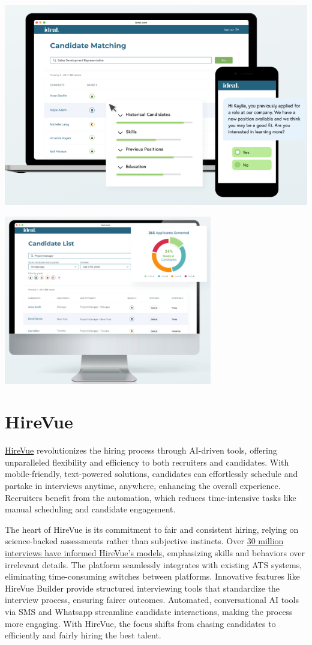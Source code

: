 \documentclass[
]{book}
\begin{document}
\includegraphics[width=5.46875in,height=\textheight]{ideal pic 1.png}

\includegraphics[width=3.57292in,height=\textheight]{ideal pic 2.png}

\hypertarget{hirevue}{%
\section{HireVue}\label{hirevue}}

\href{https://www.hirevue.com/}{HireVue} revolutionizes the hiring process through AI-driven tools, offering unparalleled flexibility and efficiency to both recruiters and candidates. With mobile-friendly, text-powered solutions, candidates can effortlessly schedule and partake in interviews anytime, anywhere, enhancing the overall experience. Recruiters benefit from the automation, which reduces time-intensive tasks like manual scheduling and candidate engagement.

The heart of HireVue is its commitment to fair and consistent hiring, relying on science-backed assessments rather than subjective instincts. Over \href{https://www.hirevue.com/our-science}{30 million interviews have informed HireVue's models}, emphasizing skills and behaviors over irrelevant details. The platform seamlessly integrates with existing ATS systems, eliminating time-consuming switches between platforms. Innovative features like HireVue Builder provide structured interviewing tools that standardize the interview process, ensuring fairer outcomes. Automated, conversational AI tools via SMS and Whatsapp streamline candidate interactions, making the process more engaging. With HireVue, the focus shifts from chasing candidates to efficiently and fairly hiring the best talent.
\end{document}
